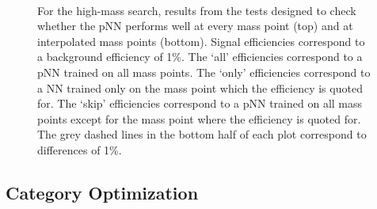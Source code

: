 \begin{figure}
    \centering
     \\
    \caption[pNN Validation Tests in the High-Mass \XYggHtt Search]{For the high-mass \XYggHtt search, results from the tests designed to check whether the pNN performs well at every mass point (top) and at interpolated mass points (bottom). Signal efficiencies correspond to a background efficiency of 1\%. The `all' efficiencies correspond to a pNN trained on all mass points. The `only' efficiencies correspond to a NN trained only on the mass point which the efficiency is quoted for. The `skip' efficiencies correspond to a pNN trained on all mass points except for the mass point where the efficiency is quoted for. The grey dashed lines in the bottom half of each plot correspond to differences of 1\%.}\label{fig:param_tests_high_mass}
\end{figure}

\subsection{Category Optimization}\label{sec:cat_optim}

